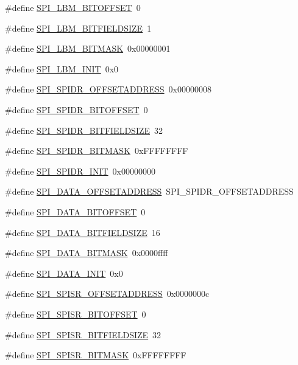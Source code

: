 \begin{DoxyCompactItemize}
\item 
\#define \hyperlink{a00573_a30460110478a79b3f10dd022a86afe06}{SPI\_\-LBM\_\-BITOFFSET}~0
\item 
\#define \hyperlink{a00573_aad5a1b1b47d9b6441701b4bccf01552a}{SPI\_\-LBM\_\-BITFIELDSIZE}~1
\item 
\#define \hyperlink{a00573_ac4d3af9e2265216d54fdf20542a844a3}{SPI\_\-LBM\_\-BITMASK}~0x00000001
\item 
\#define \hyperlink{a00573_af3e7b414f3a207c667bf1513bfeeb3cb}{SPI\_\-LBM\_\-INIT}~0x0
\item 
\#define \hyperlink{a00573_ad2c6e72df96595c66cc94c12eab6f471}{SPI\_\-SPIDR\_\-OFFSETADDRESS}~0x00000008
\item 
\#define \hyperlink{a00573_a3ab67f6ddbb675849cde7f8cc3d2b960}{SPI\_\-SPIDR\_\-BITOFFSET}~0
\item 
\#define \hyperlink{a00573_a5450afb7342d269a595c7b6eaea9a9e3}{SPI\_\-SPIDR\_\-BITFIELDSIZE}~32
\item 
\#define \hyperlink{a00573_a5abaa540effda73cde59e303cc5d6993}{SPI\_\-SPIDR\_\-BITMASK}~0xFFFFFFFF
\item 
\#define \hyperlink{a00573_a8322bb1b9452e342f783c0b18e0f19f9}{SPI\_\-SPIDR\_\-INIT}~0x00000000
\item 
\#define \hyperlink{a00573_a5df5ae781fac42c083ae9d503b61a202}{SPI\_\-DATA\_\-OFFSETADDRESS}~SPI\_\-SPIDR\_\-OFFSETADDRESS
\item 
\#define \hyperlink{a00573_aa1e62a8cadacab35a4298c3a78719520}{SPI\_\-DATA\_\-BITOFFSET}~0
\item 
\#define \hyperlink{a00573_afec459e47f23462c97a5b8a12db3c909}{SPI\_\-DATA\_\-BITFIELDSIZE}~16
\item 
\#define \hyperlink{a00573_a7c9f8cfc1783904928f0f8b6254152c0}{SPI\_\-DATA\_\-BITMASK}~0x0000ffff
\item 
\#define \hyperlink{a00573_a95256c5ae1712097e1871ffb6e3fe134}{SPI\_\-DATA\_\-INIT}~0x0
\item 
\#define \hyperlink{a00573_a949508ccf8388d5540658d6b515997fd}{SPI\_\-SPISR\_\-OFFSETADDRESS}~0x0000000c
\item 
\#define \hyperlink{a00573_a383ac627129114ff62c14f496d720d80}{SPI\_\-SPISR\_\-BITOFFSET}~0
\item 
\#define \hyperlink{a00573_a14002a8968e489d283279b1ac1d602d5}{SPI\_\-SPISR\_\-BITFIELDSIZE}~32
\item 
\#define \hyperlink{a00573_a1028f570efd47ca92d4164ff1d6217ab}{SPI\_\-SPISR\_\-BITMASK}~0xFFFFFFFF
\item 

\end{DoxyCompactItemize}
